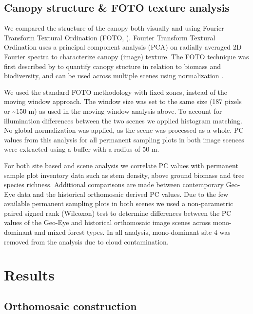 \documentclass[remote sensing,article,submit,moreauthors,pdftex]{mdpi}
\begin{document}
\hypertarget{canopy-structure-foto-texture-analysis}{%
\subsection{Canopy structure \& FOTO texture
analysis}\label{canopy-structure-foto-texture-analysis}}

We compared the structure of the canopy both visually and using Fourier
Transform Textural Ordination (FOTO, \citet{couteron2002}). Fourier
Transform Textural Ordination uses a principal component analysis (PCA)
on radially averaged 2D Fourier spectra to characterize canopy (image)
texture. The FOTO technique was first described by \citet{couteron2002}
to quantify canopy stucture in relation to biomass and biodiversity, and
can be used across multiple scenes using normalization
\citep{Barbier2010}.

We used the standard FOTO methodology with fixed zones, instead of the
moving window approach. The window size was set to the same size (187
pixels or \textasciitilde{}150 m) as used in the moving window analysis
above. To account for illumination differences between the two scenes we
applied histogram matching. No global normalization was applied, as the
scene was processed as a whole. PC values from this analysis for all
permanent sampling plots in both image scences were extracted using a
buffer with a radius of 50 m.

For both site based and scene analysis we correlate PC values with
permanent sample plot inventory data such as stem density, above ground
biomass and tree species richness. Additional comparisons are made
between contemporary Geo-Eye data and the historical orthomosaic derived
PC values. Due to the few available permanent sampling plots in both
scenes we used a non-parametric paired signed rank (Wilcoxon) test to
determine differences between the PC values of the Geo-Eye and
historical orthomosaic image scenes across mono-dominant and mixed
forest types. In all analysis, mono-dominant site 4 was removed from the
analysis due to cloud contamination.

\hypertarget{results}{%
\section{Results}\label{results}}

\hypertarget{orthomosaic-construction}{%
\subsection{Orthomosaic construction}\label{orthomosaic-construction}}
\end{document}
